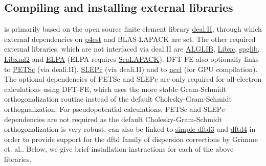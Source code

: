\subsection{Compiling and installing external libraries}
\dftfe{} is primarily based on the open source finite element library \href{http://www.dealii.org/}{deal.II}, through which external dependencies
on \href{http://p4est.org/}{p4est} and BLAS-LAPACK are set. The other required external libraries, which are
not interfaced via deal.II are \href{http://www.alglib.net/}{ALGLIB}, \href{http://www.tddft.org/programs/libxc/}{Libxc}, \href{https://atztogo.github.io/spglib/}{spglib}, \href{http://www.xmlsoft.org/}{Libxml2} and \href{https://elpa.mpcdf.mpg.de/}{ELPA} (ELPA requires \href{http://www.netlib.org/scalapack/}{ScaLAPACK}). DFT-FE also optionally links to \href{https://www.mcs.anl.gov/petsc/}{PETSc} (via deali.II), \href{http://slepc.upv.es/}{SLEPc} (via deali.II) and to \href{https://developer.nvidia.com/nccl}{nccl} (for GPU compilation). The optional dependencies of PETSc and SLEPc are only required for all-electron calculations using DFT-FE, which uses the more stable Gram-Schmidt orthogonalization routine instead of the default Cholesky-Gram-Schmidt orthognalization. For pseudopotential calculations, PETSc and SLEPc dependencies are not required as the default Cholesky-Gram-Schmidt orthogonalization is very robust. \dftfe{} can also be linked to \href{https://github.com/awvwgk/simple-dftd3}{simple-dftd3} and \href{https://github.com/dftd4/dftd4}{dftd4} in order to provide support for the dftd family of dispersion corrections by Grimme et. al.. Below, we give brief installation instructions for each of the above libraries.
